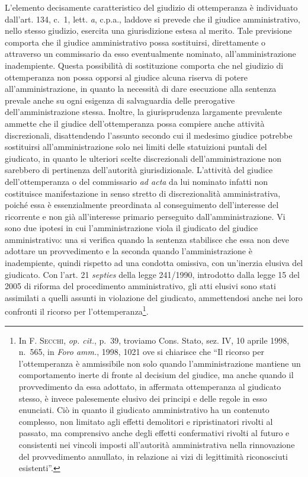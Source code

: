 \documentclass[12pt,it,a4paper,]{report}
\begin{document}
L'elemento decisamente caratteristico del giudizio di ottemperanza è
individuato dall'art. 134, c.~1, lett. \emph{a}, c.p.a., laddove si
prevede che il giudice amministrativo, nello stesso giudizio, esercita
una giurisdizione estesa al merito. Tale previsione comporta che il
giudice amministrativo possa sostituirsi, direttamente o attraverso un
commissario da esso eventualmente nominato, all'amministrazione
inadempiente. Questa possibilità di sostituzione comporta che nel
giudizio di ottemperanza non possa opporsi al giudice alcuna riserva di
potere all'amministrazione, in quanto la necessità di dare esecuzione
alla sentenza prevale anche su ogni esigenza di salvaguardia delle
prerogative dell'amministrazione stessa. Inoltre, la giurisprudenza
largamente prevalente ammette che il giudice dell'ottemperanza possa
compiere anche attività discrezionali, disattendendo l'assunto secondo
cui il medesimo giudice potrebbe sostituirsi all'amministrazione solo
nei limiti delle statuizioni puntali del giudicato, in quanto le
ulteriori scelte discrezionali dell'amministrazione non sarebbero di
pertinenza dell'autorità giurisdizionale. L'attività del giudice
dell'ottemperanza o del commissario \emph{ad acta} da lui nominato
infatti non costituisce manifestazione in senso stretto di
discrezionalità amministrativa, poiché essa è essenzialmente preordinata
al conseguimento dell'interesse del ricorrente e non già all'interesse
primario perseguito dall'amministrazione. Vi sono due ipotesi in cui
l'amministrazione viola il giudicato del giudice amministrativo: una si
verifica quando la sentenza stabilisce che essa non deve adottare un
provvedimento e la seconda quando l'amministrazione è inadempiente,
quindi rispetto ad una condotta omissiva, con un'inerzia elusiva del
giudicato. Con l'art. 21 \emph{septies} della legge 241/1990, introdotto
dalla legge 15 del 2005 di riforma del procedimento amministrativo, gli
atti elusivi sono stati assimilati a quelli assunti in violazione del
giudicato, ammettendosi anche nei loro confronti il ricorso per
l'ottemperanza\footnote{In \textsc{F. Secchi}, \emph{op. cit.}, p.~39,
  troviamo Cons. Stato, sez. IV, 10 aprile 1998, n.~565, in \emph{Foro
  amm.}, 1998, 1021 ove si chiarisce che ``Il ricorso per l'ottemperanza
  è ammissibile non solo quando l'amministrazione mantiene un
  comportamento inerte di fronte al decisium del giudice, ma anche
  quando il provvedimento da essa adottato, in affermata ottemperanza al
  giudicato stesso, è invece palesemente elusivo dei principi e delle
  regole in esso enunciati. Ciò in quanto il giudicato amministrativo ha
  un contenuto complesso, non limitato agli effetti demolitori e
  ripristinatori rivolti al passato, ma comprensivo anche degli effetti
  confermativi rivolti al futuro e consistenti nei vincoli imposti
  all'autorità amministrativa nella rinnovazione del provvedimento
  annullato, in relazione ai vizi di legittimità riconosciuti
  esistenti''.}.
\end{document}
